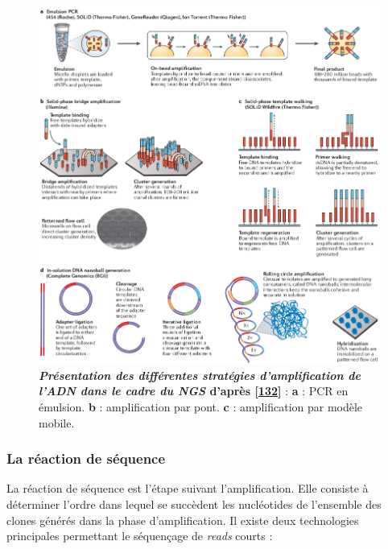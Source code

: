 \documentclass[12pt,a4paper,twoside]{ugathesis}
\theoremstyle{definition}
\theoremstyle{definition}
\theoremstyle{definition}
\theoremstyle{remark}
\begin{document}
\begin{figure}

{\centering \includegraphics[scale=.5]{figure/ngs_amplification} 

}

\caption[Présentation des différentes stratégies d'amplification de l'ADN dans le cadre du NGS]{\textbf{\emph{Présentation des différentes stratégies
d'amplification de l'ADN dans le cadre du NGS} d'après
{[}\protect\hyperlink{ref-Goodwin2016}{132}{]}} : \textbf{a} : PCR en
émulsion. \textbf{b} : amplification par pont. \textbf{c} :
amplification par modèle mobile.}\label{fig:pictngsampli}
\end{figure}







\newpage

\subsubsection{La réaction de séquence}\label{la-reaction-de-sequence}

La réaction de séquence est l'étape suivant l'amplification. Elle
consiste à déterminer l'ordre dans lequel se succèdent les nucléotides
de l'ensemble des clones générés dans la phase d'amplification. Il
existe deux technologies principales permettant le séquençage de
\emph{reads} courts :
\end{document}
